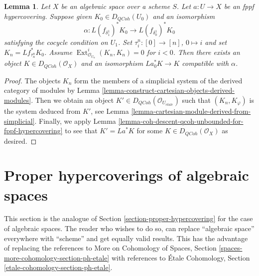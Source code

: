 \documentclass{stacks-project}
\theoremstyle{plain}
\newtheorem{lemma}[subsection]{Lemma}
\theoremstyle{definition}
\theoremstyle{remark}
\numberwithin{equation}{subsection}
\def\Ext{\mathop{\mathrm{Ext}}\nolimits}
\def\etale{{\acute{e}tale}}
\def\QCoh{\mathit{QCoh}}
\begin{document}
\begin{lemma}
\label{lemma-fppf-glue-neg-ext-zero}
Let $X$ be an algebraic space over a scheme $S$.
Let $a : U \to X$ be an fppf hypercovering.
Suppose given $K_0 \in D_\QCoh(U_0)$ and an isomorphism
$$
\alpha :
L(f_{\delta_1^1})^*K_0
\longrightarrow
L(f_{\delta_0^1})^*K_0
$$
satisfying the cocycle condition on $U_1$. Set
$\tau^n_i : [0] \to [n]$, $0 \mapsto i$ and
set $K_n = Lf_{\tau^n_n}^*K_0$.
Assume $\Ext^i_{\mathcal{O}_{U_n}}(K_n, K_n) = 0$ for $i < 0$.
Then there exists an object $K \in D_\QCoh(\mathcal{O}_X)$
and an isomorphism $La_0^*K \to K$ compatible with $\alpha$.
\end{lemma}

\begin{proof}
The objects $K_n$ form the members of a  simplicial system of the
derived category of modules by
Lemma \ref{lemma-construct-cartesian-objects-derived-modules}.
Then we obtain an object
$K' \in D_\QCoh(\mathcal{O}_{U_\etale})$
such that $(K_n, K_\varphi)$ is the system deduced from $K'$, see
Lemma \ref{lemma-cartesian-module-derived-from-simplicial}.
Finally, we apply
Lemma \ref{lemma-coh-descent-qcoh-unbounded-for-fppf-hypercovering}
to see that $K' = La^*K$ for some $K \in D_\QCoh(\mathcal{O}_X)$
as desired.
\end{proof}











\section{Proper hypercoverings of algebraic spaces}
\label{section-proper-hypercovering-spaces}

\noindent
This section is the analogue of Section \ref{section-proper-hypercovering}
for the case of algebraic spaces.
The reader who wishes to do so, can replace ``algebraic space''
everywhere with ``scheme'' and get equally valid results.
This has the advantage of replacing the references to
More on Cohomology of Spaces, Section
\ref{spaces-more-cohomology-section-ph-etale}
with references to
\'Etale Cohomology, Section \ref{etale-cohomology-section-ph-etale}.
\end{document}
